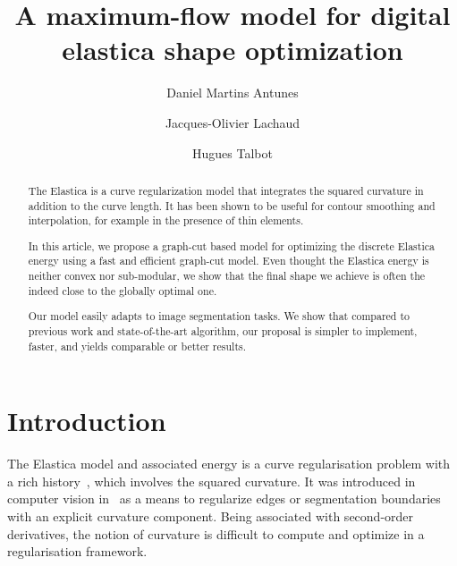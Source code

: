 \documentclass[runningheads]{llncs}
\begin{document}
%
\title{A maximum-flow model for digital elastica shape optimization}
%
%
\author{Daniel Martins Antunes \and
Jacques-Olivier Lachaud \and
Hugues Talbot}
%
%
%
\maketitle              %
%
\begin{abstract}
  The Elastica is a curve regularization model that integrates the squared curvature in addition to the curve length. It
  has been shown to be useful for contour smoothing and interpolation, for example in the presence of thin
  elements.

  In this article, we propose a graph-cut based model for optimizing the discrete Elastica energy using a fast and
  efficient graph-cut model.  Even thought the Elastica energy is neither convex nor sub-modular, we show that the final
  shape we achieve is often the indeed close to the globally optimal one.

  Our model easily adapts to image segmentation tasks. We show that compared to previous work and state-of-the-art
  algorithm, our proposal is simpler to implement, faster, and yields comparable or better results.

\end{abstract}
%
%
%
\section{Introduction}

The Elastica model and associated energy is a curve regularisation problem with a rich
history~\cite{matsutani2010euler,levien08elastica}, which involves the squared curvature.  It was introduced in computer
vision in~\cite{mumford94elastica} as a means to regularize edges or segmentation boundaries with an explicit curvature
component. Being associated with second-order derivatives, the notion of curvature is difficult to compute and optimize
in a regularisation framework.
\end{document}
